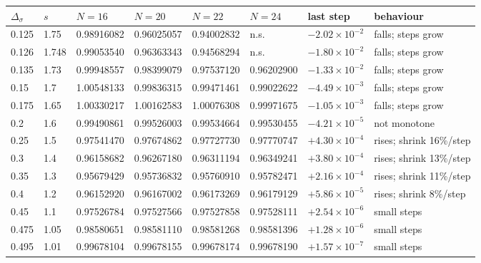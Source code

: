 \begin{tabular}{@{}l l l l l l l l@{}}
\toprule
$\Delta_\sigma$ & $s$ & $N=16$ & $N=20$ & $N=22$ & $N=24$ & last step & behaviour\\
\midrule
0.125 & 1.75 & 0.98916082 & 0.96025057 & 0.94002832 & n.s. & $-2.02\times10^{-2}$ & falls; steps grow\\
0.126 & 1.748 & 0.99053540 & 0.96363343 & 0.94568294 & n.s. & $-1.80\times10^{-2}$ & falls; steps grow\\
0.135 & 1.73 & 0.99948557 & 0.98399079 & 0.97537120 & 0.96202900 & $-1.33\times10^{-2}$ & falls; steps grow\\
0.15 & 1.7 & 1.00548133 & 0.99836315 & 0.99471461 & 0.99022622 & $-4.49\times10^{-3}$ & falls; steps grow\\
0.175 & 1.65 & 1.00330217 & 1.00162583 & 1.00076308 & 0.99971675 & $-1.05\times10^{-3}$ & falls; steps grow\\
0.2 & 1.6 & 0.99490861 & 0.99526003 & 0.99534664 & 0.99530455 & $-4.21\times10^{-5}$ & not monotone\\
0.25 & 1.5 & 0.97541470 & 0.97674862 & 0.97727730 & 0.97770747 & $+4.30\times10^{-4}$ & rises; shrink 16\%/step\\
0.3 & 1.4 & 0.96158682 & 0.96267180 & 0.96311194 & 0.96349241 & $+3.80\times10^{-4}$ & rises; shrink 13\%/step\\
0.35 & 1.3 & 0.95679429 & 0.95736832 & 0.95760910 & 0.95782471 & $+2.16\times10^{-4}$ & rises; shrink 11\%/step\\
0.4 & 1.2 & 0.96152920 & 0.96167002 & 0.96173269 & 0.96179129 & $+5.86\times10^{-5}$ & rises; shrink 8\%/step\\
0.45 & 1.1 & 0.97526784 & 0.97527566 & 0.97527858 & 0.97528111 & $+2.54\times10^{-6}$ & small steps\\
0.475 & 1.05 & 0.98580651 & 0.98581110 & 0.98581268 & 0.98581396 & $+1.28\times10^{-6}$ & small steps\\
0.495 & 1.01 & 0.99678104 & 0.99678155 & 0.99678174 & 0.99678190 & $+1.57\times10^{-7}$ & small steps\\
\bottomrule
\end{tabular}
